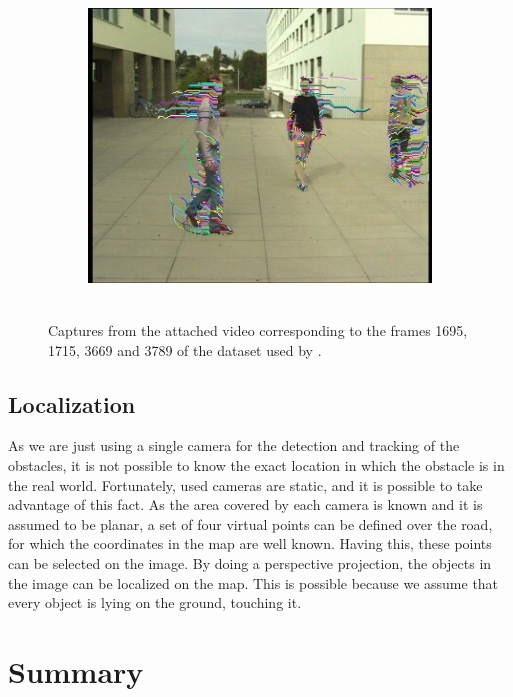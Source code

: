 \begin{figure}[t]
        ~
        \begin{subfigure}[b]{0.24\textwidth}
                \centering
                \includegraphics[width=\textwidth, trim=6 0 5 1, clip]{fig8.jpg}
                \caption{~}
                \label{fig:cp02_videoCapture4}
        \end{subfigure}%
        \caption{Captures from the attached video corresponding to the frames 1695, 1715, 3669 and 3789 of the dataset used by \cite{berclaz2011multiple}.}\label{fig:cp02_videoCaptures}
\end{figure}

\subsection{Localization}\label{ch:chapter02_01_03}

As we are just using a single camera for the detection and tracking of the obstacles, it is not possible to know the exact location in which the obstacle is in the real world. Fortunately, used cameras are static, and it is possible to take advantage of this fact. As the area covered by each camera is known and it is assumed to be planar, a set of four virtual points can be defined over the road, for which the coordinates in the map are well known.
Having this, these points can be selected on the image. By doing a perspective projection, the objects in the image can be localized on the map. This is possible because we assume that every object is lying on the ground, touching it.

\section{Summary}\label{ch:chapter02_03}

